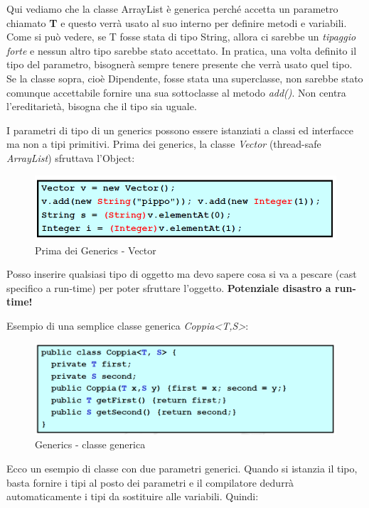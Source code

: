 Qui vediamo che la classe ArrayList è generica perché accetta un parametro chiamato \textbf{T} e questo verrà usato al suo interno per definire metodi e variabili. Come si può vedere, se T fosse stata di tipo String, allora ci sarebbe un \textit{tipaggio forte} e nessun altro tipo sarebbe stato accettato.
In pratica, una volta definito il tipo del parametro, bisognerà sempre tenere presente che verrà usato quel tipo. Se la classe sopra, cioè Dipendente, fosse stata una superclasse, non sarebbe stato comunque accettabile fornire una sua sottoclasse al metodo \textit{add()}. Non centra l’ereditarietà, bisogna che il tipo sia uguale.

I parametri di tipo di un generics possono essere istanziati a classi ed interfacce ma non a tipi primitivi.
Prima dei generics, la classe \textit{Vector} (thread-safe \textit{ArrayList}) sfruttava l'Object:

\begin{figure}[H]
\centering
\includegraphics[scale=0.6]{images/classiGeneriche2}
\caption{Prima dei Generics - Vector\label{fig:UC3}}
\end{figure}
Posso inserire qualsiasi tipo di oggetto ma devo sapere cosa si va a pescare (cast specifico a run-time) per poter sfruttare l'oggetto. \textbf{{\color{error}Potenziale disastro a run-time!}}

Esempio di una semplice classe generica \textit{Coppia<T,S>}:
\begin{figure}[H]
\centering
\includegraphics[scale=0.6]{images/classiGeneriche3}
\caption{Generics - classe generica\label{fig:UC3}}
\end{figure}

Ecco un esempio di classe con due parametri generici. Quando si istanzia il tipo, basta fornire i tipi al posto dei parametri e il compilatore dedurrà automaticamente i tipi da sostituire alle variabili. Quindi:

